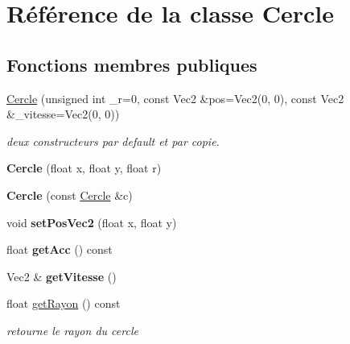 \hypertarget{class_cercle}{}\section{Référence de la classe Cercle}
\label{class_cercle}
\subsection*{Fonctions membres publiques}
\begin{DoxyCompactItemize}
\item 
\mbox{\label{class_cercle_a372f6c395207e159d750a4dd9d32ffba}} 
\mbox{\hyperlink{class_cercle_a372f6c395207e159d750a4dd9d32ffba}{Cercle}} (unsigned int \+\_\+r=0, const Vec2 \&pos=Vec2(0, 0), const Vec2 \&\+\_\+vitesse=Vec2(0, 0))
\begin{DoxyCompactList}\small\item\em deux constructeurs par default et par copie. \end{DoxyCompactList}\item 
\mbox{\label{class_cercle_a264c7e3272b98fe7e9846fc75fd18171}} 
{\bfseries Cercle} (float x, float y, float r)
\item 
\mbox{\label{class_cercle_afde23d1a195aba93d89d7f5eb39c929b}} 
{\bfseries Cercle} (const \mbox{\hyperlink{class_cercle}{Cercle}} \&c)
\item 
\mbox{\label{class_cercle_a09b99ae93d7f76990cb0249d843d2f64}} 
void {\bfseries set\+Pos\+Vec2} (float x, float y)
\item 
\mbox{\label{class_cercle_a3c85ccf0f1d79cb0824f1bac0cb6ffd8}} 
float {\bfseries get\+Acc} () const
\item 
\mbox{\label{class_cercle_a3874d00fe210def896576d30cd19baf6}} 
Vec2 \& {\bfseries get\+Vitesse} ()
\item 
\mbox{\label{class_cercle_a8d2427e6a2b1c610d4df4db25ea463c0}} 
float \mbox{\hyperlink{class_cercle_a8d2427e6a2b1c610d4df4db25ea463c0}{get\+Rayon}} () const
\begin{DoxyCompactList}\small\item\em retourne le rayon du cercle \end{DoxyCompactList}\item 

\end{DoxyCompactItemize}
